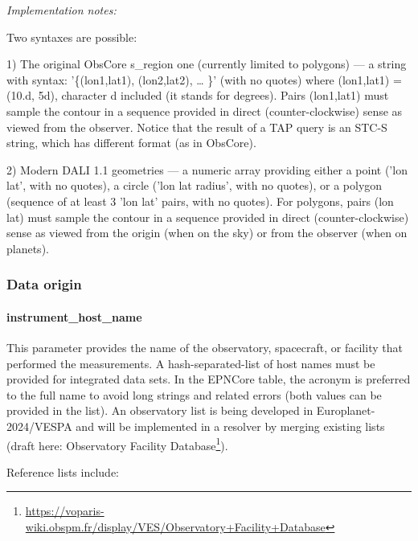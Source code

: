 \documentclass[11pt,a4paper]{ivoa}
\begin{document}
\emph{Implementation notes:}

Two syntaxes are possible:

1) The original ObsCore s\_region one (currently limited to polygons) — a string with syntax: '\{(lon1,lat1), (lon2,lat2), … \}' (with no quotes) where (lon1,lat1) = (10.d, 5d), character d included (it stands for degrees). Pairs (lon1,lat1) must sample the contour in a sequence provided in direct (counter-clockwise) sense as viewed from the observer. Notice that the result of a TAP query is an STC-S string, which has different format (as in ObsCore). 

2) Modern DALI 1.1 geometries — a numeric array providing either a point ('lon lat', with no quotes), a circle ('lon lat radius', with no quotes), or a polygon (sequence of at least 3 'lon lat' pairs, with no quotes). For polygons, pairs (lon lat) must sample the contour in a sequence provided in direct (counter-clockwise) sense as viewed from the origin (when on the sky) or from the observer (when on planets).

\subsubsection{Data origin}

\paragraph{instrument\_host\_name}

This parameter provides the name of the observatory, spacecraft, or facility that performed the measurements. A hash-separated-list of host names must be provided for integrated data sets. In the EPNCore table, the acronym is preferred to the full name to avoid long strings and related errors (both values can be provided in the list). An observatory list is being developed in Europlanet-2024/VESPA and will be implemented in a resolver by merging existing lists (draft here: Observatory Facility Database\footnote{\url{https://voparis-wiki.obspm.fr/display/VES/Observatory+Facility+Database}}).

Reference lists include:
\end{document}
